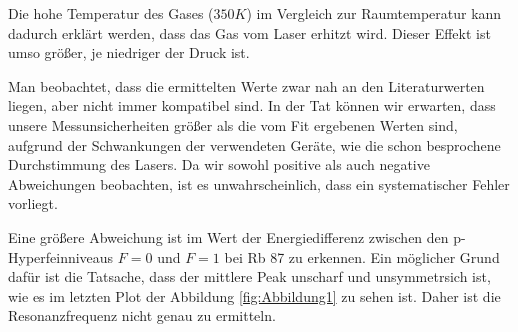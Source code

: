 \documentclass[a4paper,parskip]{scrartcl}
\begin{document}
Die hohe Temperatur des Gases ($350K$) im Vergleich zur Raumtemperatur kann dadurch erklärt werden, dass das Gas vom Laser erhitzt wird. Dieser Effekt ist umso größer, je niedriger der Druck ist.

Man beobachtet, dass die ermittelten Werte zwar nah an den Literaturwerten liegen, aber nicht immer kompatibel sind. In der Tat können wir erwarten, dass unsere Messunsicherheiten größer als die vom Fit ergebenen Werten sind, aufgrund der Schwankungen der verwendeten Geräte, wie die schon besprochene Durchstimmung des Lasers. Da wir sowohl positive als auch negative Abweichungen beobachten, ist es unwahrscheinlich, dass ein systematischer Fehler vorliegt.

Eine größere Abweichung ist im Wert der Energiedifferenz zwischen den p-Hyperfeinniveaus $F=0$ und $F=1$ bei Rb 87 zu erkennen. Ein möglicher Grund dafür ist die Tatsache, dass der mittlere Peak unscharf und unsymmetrsich ist, wie es im letzten Plot der Abbildung \ref{fig:Abbildung1} zu sehen ist. Daher ist die Resonanzfrequenz nicht genau zu ermitteln.

\newpage


\end{document}
